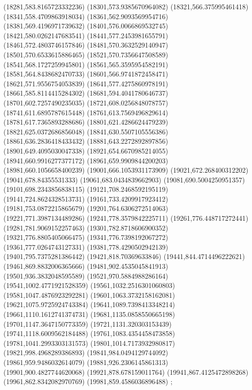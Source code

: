 {(18281,583.8165723332236)
(18301,573.9385670964082)
(18321,566.375995461418)
(18341,558.4709863918034)
(18361,562.9093569954716)
(18381,569.4196971739632)
(18401,576.0066869532745)
(18421,580.0262147683541)
(18441,577.2453981655791)
(18461,572.4803746157846)
(18481,570.3632529140947)
(18501,570.6533615886465)
(18521,570.7356647508589)
(18541,568.1727259945801)
(18561,565.3595954582191)
(18581,564.8438682470733)
(18601,566.9741872458471)
(18621,571.9556754053839)
(18641,577.4275860978191)
(18661,585.8114415284302)
(18681,594.4041780646737)
(18701,602.7257490235035)
(18721,608.0256848078757)
(18741,611.6895787615448)
(18761,613.7569496829614)
(18781,617.7365893288686)
(18801,621.4286624479239)
(18821,625.0372686856048)
(18841,630.5507105556386)
(18861,636.2836418433432)
(18881,643.2272892897856)
(18901,649.4095030047338)
(18921,654.6670985214055)
(18941,660.9916277377172)
(18961,659.9909844200203)
(18981,660.1056658400239)
(19001,666.1053931173909)
(19021,672.268400312202)
(19041,678.84355531333)
(19061,683.0434839662903)
(19081,690.5004250951357)
(19101,698.2343856838115)
(19121,708.2468592195119)
(19141,724.8624328513731)
(19161,733.4209917923412)
(19181,753.0872215865679)
(19201,764.6306272514063)
(19221,771.3987134489286)
(19241,778.3579842225711)
(19261,776.448717272441)
(19281,781.9069152257463)
(19301,782.8718606900352)
(19321,776.8805405066475)
(19341,776.7398192067272)
(19361,777.0264743127331)
(19381,778.4290502942139)
(19401,795.7375281386442)
(19421,818.70369633846)
(19441,844.4714496222621)
(19461,869.8832006365666)
(19481,902.4535045841913)
(19501,936.3832048595589)
(19521,970.5884988286164)
(19541,1002.4771921528359)
(19561,1032.2516301060803)
(19581,1047.4876923292281)
(19601,1063.3732158162081)
(19621,1075.9725924743384)
(19641,1089.7398413348214)
(19661,1110.1612741374731)
(19681,1135.0858550665198)
(19701,1147.3647150773359)
(19721,1131.320303153439)
(19741,1118.6009562184488)
(19761,1083.4354458473858)
(19781,1041.2993303131573)
(19801,1014.7173932980817)
(19821,998.4968289386893)
(19841,984.0494129744092)
(19861,959.9486032614079)
(19881,926.2306145861313)
(19901,900.4827744620068)
(19921,878.678159011764)
(19941,867.4125472898268)
(19961,862.8342082970769)
(19981,859.4586036896488)
};
